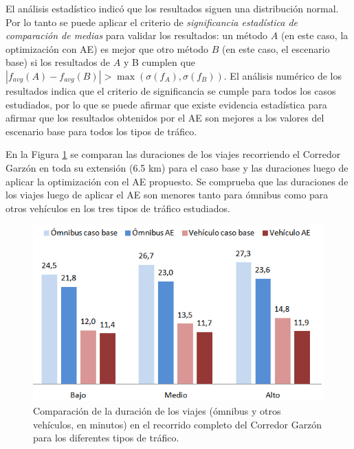 El análisis estadístico 
indicó que los resultados 
siguen una distribución normal. Por lo tanto se puede aplicar el criterio de \textit{significancia estadística de comparación de medias} para validar los resultados:
un método $A$ (en este caso, la optimización con AE) es mejor que otro método $B$ (en este caso, el escenario base) si los resultados de $A$ y B cumplen que 
$
\left |f_{avg}(A) - f_{avg}(B)  \right | > \max(\sigma(f_A),\sigma(f_B))
$.
%
El análisis numérico de los resultados indica que el criterio de significancia se cumple para todos los casos estudiados, por lo que se puede afirmar que existe evidencia estadística para afirmar que los resultados obtenidos por el AE son mejores a los valores del escenario base para todos los tipos de tráfico.

En la Figura \ref{fig:duracion_viajes} se comparan las duraciones de los viajes recorriendo el Corredor Garzón en toda su extensión (6.5 km) para el caso base y las duraciones luego de aplicar la optimización con el AE propuesto. Se comprueba que las duraciones de los viajes luego de aplicar el AE son menores tanto para ómnibus como para otros vehículos en los tres tipos de tráfico estudiados.
 
\begin{figure}[!h]
	\centering
	\includegraphics[width=0.8\linewidth]{Figures/duracion_viajes}
	\caption[Comparación de la duración de los viajes en el escenario base y al aplicar el AE.]{Comparación de la duración de los viajes (ómnibus y otros vehículos, en minutos) en el recorrido completo del Corredor Garzón para los diferentes tipos de tráfico.
}
	\label{fig:duracion_viajes}
\end{figure}


